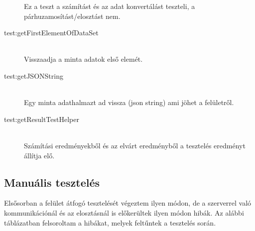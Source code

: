 \begin{description}
			Ez a teszt a számítást és az adat konvertálást teszteli, a párhuzamosítást/elosztást nem.
		\item[test:getFirstElementOfDataSet] \hfill \\
			Visszaadja a minta adatok első elemét.
		\item[test:getJSONString] \hfill \\
			Egy minta adathalmazt ad vissza (json string) ami jöhet a felületről.
		\item[test:getResultTestHelper] \hfill \\
			Számítási eredményekből és az elvárt eredményből a tesztelés eredményt állítja elő. 
	\end{description}

\subsection{Manuális tesztelés}
	Elsősorban a felület átfogó tesztelését végeztem ilyen módon, de a szerverrel való kommunikációnál és az elosztásnál is előkerültek ilyen módon hibák. \newline
	Az alábbi táblázatban felsoroltam a hibákat, melyek feltűntek a tesztelés során. 
